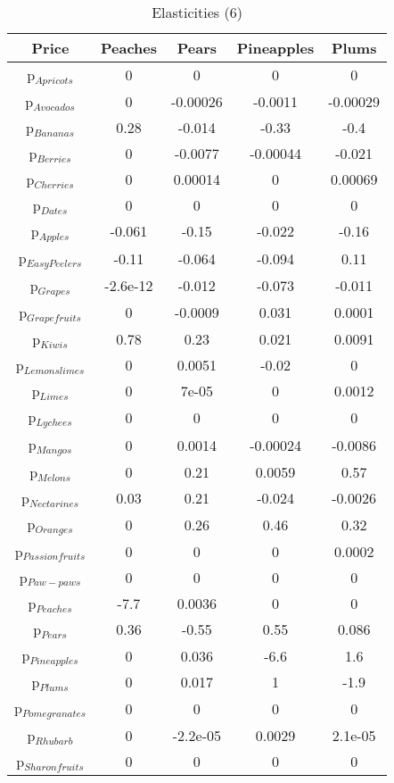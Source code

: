 \documentclass[11pt]{article}
\begin{document}
\begin{table}[h]
\caption{Elasticities (6)}
\label{Table: elasticities 6}
\begin{center}
\begin{tabular}{ccccc}
Price & Peaches & Pears & Pineapples & Plums \\ \hline
p$_{Apricots}$ & 0 & 0 & 0 & 0 \\ 
p$_{Avocados}$ & 0 & -0.00026 & -0.0011 & -0.00029 \\ 
p$_{Bananas}$ & 0.28 & -0.014 & -0.33 & -0.4 \\ 
p$_{Berries}$ & 0 & -0.0077 & -0.00044 & -0.021 \\ 
p$_{Cherries}$ & 0 & 0.00014 & 0 & 0.00069 \\ 
p$_{Dates}$ & 0 & 0 & 0 & 0 \\ 
p$_{Apples}$ & -0.061 & -0.15 & -0.022 & -0.16 \\ 
p$_{Easy Peelers}$ & -0.11 & -0.064 & -0.094 & 0.11 \\ 
p$_{Grapes}$ & -2.6e-12 & -0.012 & -0.073 & -0.011 \\ 
p$_{Grapefruits}$ & 0 & -0.0009 & 0.031 & 0.0001 \\ 
p$_{Kiwis}$ & 0.78 & 0.23 & 0.021 & 0.0091 \\ 
p$_{Lemonslimes}$ & 0 & 0.0051 & -0.02 & 0 \\ 
p$_{Limes}$ & 0 & 7e-05 & 0 & 0.0012 \\ 
p$_{Lychees}$ & 0 & 0 & 0 & 0 \\ 
p$_{Mangos}$ & 0 & 0.0014 & -0.00024 & -0.0086 \\ 
p$_{Melons}$ & 0 & 0.21 & 0.0059 & 0.57 \\ 
p$_{Nectarines}$ & 0.03 & 0.21 & -0.024 & -0.0026 \\ 
p$_{Oranges}$ & 0 & 0.26 & 0.46 & 0.32 \\ 
p$_{Passion fruits}$ & 0 & 0 & 0 & 0.0002 \\ 
p$_{Paw-paws}$ & 0 & 0 & 0 & 0 \\ 
p$_{Peaches}$ & -7.7 & 0.0036 & 0 & 0 \\ 
p$_{Pears}$ & 0.36 & -0.55 & 0.55 & 0.086 \\ 
p$_{Pineapples}$ & 0 & 0.036 & -6.6 & 1.6 \\ 
p$_{Plums}$ & 0 & 0.017 & 1 & -1.9 \\ 
p$_{Pomegranates}$ & 0 & 0 & 0 & 0 \\ 
p$_{Rhubarb}$ & 0 & -2.2e-05 & 0.0029 & 2.1e-05 \\ 
p$_{Sharon fruits}$ & 0 & 0 & 0 & 0 \\ 
\end{tabular}
\end{center}
\end{table}
\end{document}
